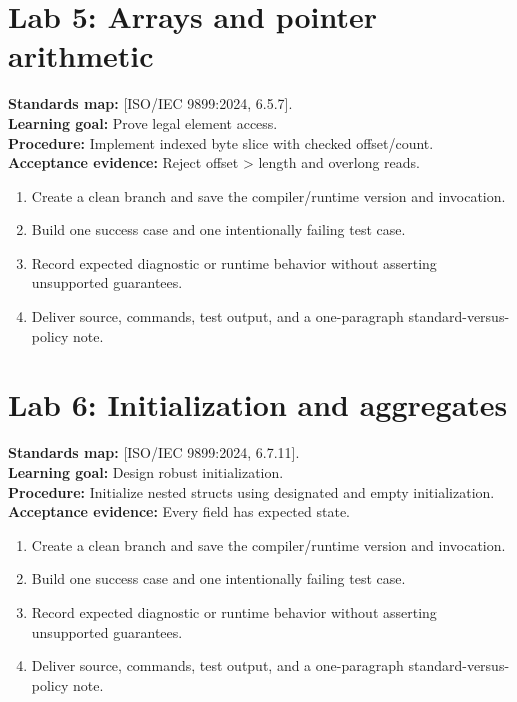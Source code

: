 \documentclass[10pt,letterpaper,oneside]{report}
\newcommand{\refcl}[1]{\textsf{\footnotesize[ISO/IEC 9899:2024, #1]}}
\begin{document}
\section{Lab 5: Arrays and pointer arithmetic}
\textbf{Standards map:} \refcl{6.5.7}.\\
\textbf{Learning goal:} Prove legal element access.\\
\textbf{Procedure:} Implement indexed byte slice with checked offset/count.\\
\textbf{Acceptance evidence:} Reject offset > length and overlong reads.
\begin{enumerate}
\item Create a clean branch and save the compiler/runtime version and invocation.
\item Build one success case and one intentionally failing test case.
\item Record expected diagnostic or runtime behavior without asserting unsupported guarantees.
\item Deliver source, commands, test output, and a one-paragraph standard-versus-policy note.
\end{enumerate}

\section{Lab 6: Initialization and aggregates}
\textbf{Standards map:} \refcl{6.7.11}.\\
\textbf{Learning goal:} Design robust initialization.\\
\textbf{Procedure:} Initialize nested structs using designated and empty initialization.\\
\textbf{Acceptance evidence:} Every field has expected state.
\begin{enumerate}
\item Create a clean branch and save the compiler/runtime version and invocation.
\item Build one success case and one intentionally failing test case.
\item Record expected diagnostic or runtime behavior without asserting unsupported guarantees.
\item Deliver source, commands, test output, and a one-paragraph standard-versus-policy note.
\end{enumerate}
\end{document}
